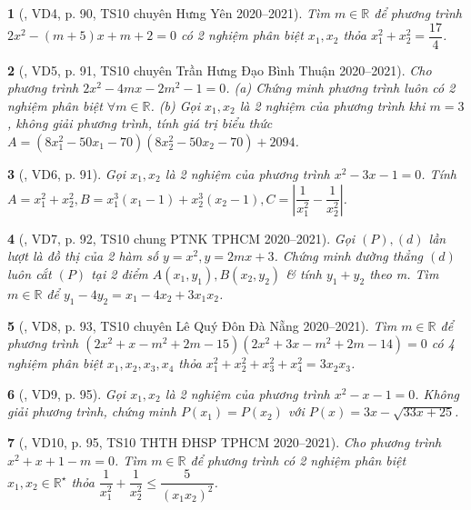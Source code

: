 \documentclass{article}
\newtheorem{baitoan}{}
\begin{document}
\begin{baitoan}[\cite{Thu_Viet_Minh_ptb2}, VD4, p. 90, TS10 chuyên Hưng Yên 2020--2021]
	Tìm $m\in\mathbb{R}$ để phương trình $2x^2 - (m + 5)x + m + 2 = 0$ có 2 nghiệm phân biệt $x_1,x_2$ thỏa $x_1^2 + x_2^2 = \dfrac{17}{4}$.
\end{baitoan}

\begin{baitoan}[\cite{Thu_Viet_Minh_ptb2}, VD5, p. 91, TS10 chuyên Trần Hưng Đạo Bình Thuận 2020--2021]
	Cho phương trình $2x^2 - 4mx - 2m^2 - 1 = 0$. (a) Chứng minh phương trình luôn có 2 nghiệm phân biệt $\forall m\in\mathbb{R}$. (b) Gọi $x_1,x_2$ là 2 nghiệm của phương trình khi $m = 3$, không giải phương trình, tính giá trị biểu thức $A = (8x_1^2 - 50x_1 - 70)(8x_2^2 - 50x_2 - 70) + 2094$.
\end{baitoan}

\begin{baitoan}[\cite{Thu_Viet_Minh_ptb2}, VD6, p. 91]
	Gọi $x_1,x_2$ là 2 nghiệm của phương trình $x^2 - 3x - 1 = 0$. Tính $A = x_1^2 + x_2^2,B = x_1^3(x_1 - 1) + x_2^3(x_2 - 1),C = \left|\dfrac{1}{x_1^2} - \dfrac{1}{x_2^2}\right|$.
\end{baitoan}

\begin{baitoan}[\cite{Thu_Viet_Minh_ptb2}, VD7, p. 92, TS10 chung PTNK TPHCM 2020--2021]
	Gọi $(P),(d)$ lần lượt là đồ thị của 2 hàm số $y = x^2,y = 2mx + 3$. Chứng minh đường thẳng $(d)$ luôn cắt $(P)$ tại 2 điểm $A(x_1,y_1),B(x_2,y_2)$ \& tính $y_1 + y_2$ theo m. Tìm $m\in\mathbb{R}$ để $y_1 - 4y_2 = x_1 - 4x_2 + 3x_1x_2$.
\end{baitoan}

\begin{baitoan}[\cite{Thu_Viet_Minh_ptb2}, VD8, p. 93, TS10 chuyên Lê Quý Đôn Đà Nẵng 2020--2021]
	Tìm $m\in\mathbb{R}$ để phương trình $(2x^2 + x - m^2 + 2m - 15)(2x^2 + 3x - m^2 + 2m - 14) = 0$ có 4 nghiệm phân biệt $x_1,x_2,x_3,x_4$ thỏa $x_1^2 + x_2^2 + x_3^2 + x_4^2 = 3x_2x_3$.
\end{baitoan}

\begin{baitoan}[\cite{Thu_Viet_Minh_ptb2}, VD9, p. 95]
	Gọi $x_1,x_2$ là 2 nghiệm của phương trình $x^2 - x - 1 = 0$. Không giải phương trình, chứng minh $P(x_1) = P(x_2)$ với $P(x) = 3x - \sqrt{33x + 25}$.
\end{baitoan}

\begin{baitoan}[\cite{Thu_Viet_Minh_ptb2}, VD10, p. 95, TS10 THTH ĐHSP TPHCM 2020--2021]
	Cho phương trình $x^2 + x + 1 - m = 0$. Tìm $m\in\mathbb{R}$ để phương trình có 2 nghiệm phân biệt $x_1,x_2\in\mathbb{R}^\star$ thỏa $\dfrac{1}{x_1^2} + \dfrac{1}{x_2^2}\le\dfrac{5}{(x_1x_2)^2}$.
\end{baitoan}
\end{document}
